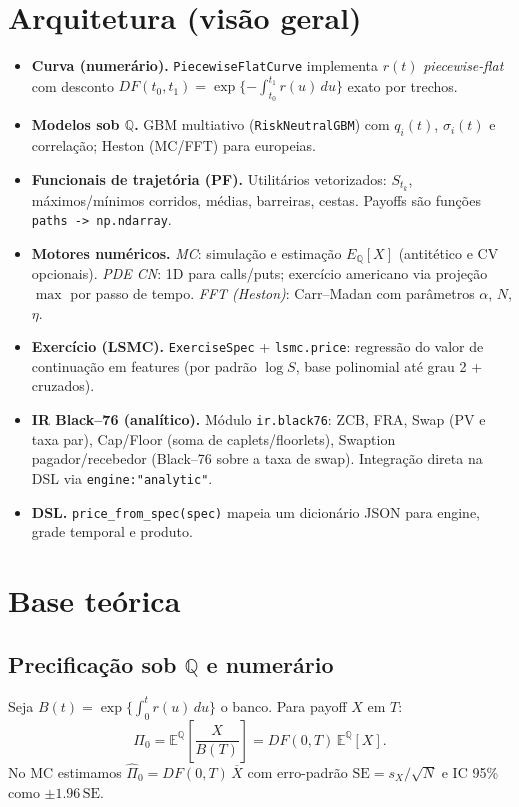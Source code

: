\documentclass[11pt,a4paper]{article}
\begin{document}
\section{Arquitetura (visão geral)}
\begin{itemize}[leftmargin=1.2em]
\item \textbf{Curva (numerário).} \texttt{PiecewiseFlatCurve} implementa $r(t)$ \emph{piecewise-flat} com desconto
$DF(t_0,t_1)=\exp\{-\int_{t_0}^{t_1} r(u)\,du\}$ exato por trechos.
\item \textbf{Modelos sob $\mathbb{Q}$.}
GBM multiativo (\texttt{RiskNeutralGBM}) com $q_i(t)$, $\sigma_i(t)$ e correlação; Heston (MC/FFT) para europeias.
\item \textbf{Funcionais de trajetória (PF).} Utilitários vetorizados: $S_{t_k}$, máximos/mínimos corridos, médias, barreiras, cestas.
Payoffs são funções \verb|paths -> np.ndarray|.
\item \textbf{Motores numéricos.}
\emph{MC}: simulação e estimação $E_{\mathbb Q}[X]$ (antitético e CV opcionais).
\emph{PDE CN}: 1D para calls/puts; exercício americano via projeção $\max$ por passo de tempo.
\emph{FFT (Heston)}: Carr--Madan com parâmetros $\alpha$, $N$, $\eta$.
\item \textbf{Exercício (LSMC).} \texttt{ExerciseSpec} + \texttt{lsmc.price}: regressão do valor de continuação em features (por padrão $\log S$,
base polinomial até grau 2 + cruzados).
\item \textbf{IR Black--76 (analítico).} Módulo \verb|ir.black76|: ZCB, FRA, Swap (PV e taxa par), Cap/Floor (soma de caplets/floorlets),
Swaption pagador/recebedor (Black--76 sobre a taxa de swap). Integração direta na DSL via \verb|engine:"analytic"|.
\item \textbf{DSL.} \texttt{price\_from\_spec(spec)} mapeia um dicionário JSON para engine, grade temporal e produto.
\end{itemize}

\section{Base teórica}

\subsection{Precificação sob $\mathbb{Q}$ e numerário}
Seja $B(t)=\exp\{\int_0^t r(u)\,du\}$ o banco. Para payoff $X$ em $T$:
\[
\Pi_0=\mathbb E^{\mathbb Q}\!\left[\frac{X}{B(T)}\right]=DF(0,T)\,\mathbb E^{\mathbb Q}[X].
\]
No MC estimamos $\hat \Pi_0 = DF(0,T)\,\overline{X}$ com erro-padrão
$\mathrm{SE}=s_X/\sqrt{N}$ e IC 95\% como $\pm 1.96\,\mathrm{SE}$.
\end{document}
